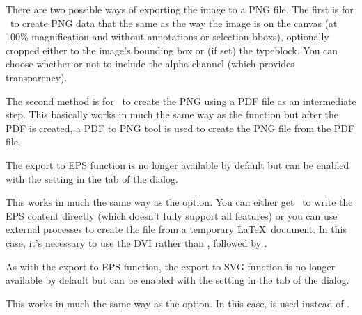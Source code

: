 \begin{deflist}
\begin{itemdesc}
There are two possible ways of exporting the image to a PNG file.
The first is for \FlowframTk\ to create PNG data that the same as
the way the image is  on the \gls{canvas}
(at 100\% magnification and without annotations or
\glspl{selection-bbox}), optionally cropped either to the image's
bounding box or (if set) the \gls{typeblock}. You can choose whether
or not to include the alpha channel (which provides transparency).

The second method is for \FlowframTk\ to create the PNG using a PDF
file as an intermediate step. This basically works in much the same
way as the  function but after the PDF is
created, a PDF to PNG tool is used to create the PNG file from the
PDF file.
\end{itemdesc}


\begin{itemdesc}
The export to EPS function is no longer available by default but can
be enabled with the  setting in 
the  tab of the  dialog.

This works in much the same way as the  option.
You can either get \FlowframTk\ to write the EPS content directly
(which doesn't fully support all features) or you can use external
processes to create the file from a temporary \LaTeX\ document.
In this case, it's necessary to use the DVI  rather than
, followed by .
\end{itemdesc}


\begin{itemdesc}
As with the export to EPS function, the export to SVG function is no
longer available by default but can be enabled with the
 setting in the
 tab of the  dialog.

This works in much the same way as the  option.
In this case,  is used instead of .
\end{itemdesc}

\end{deflist}



